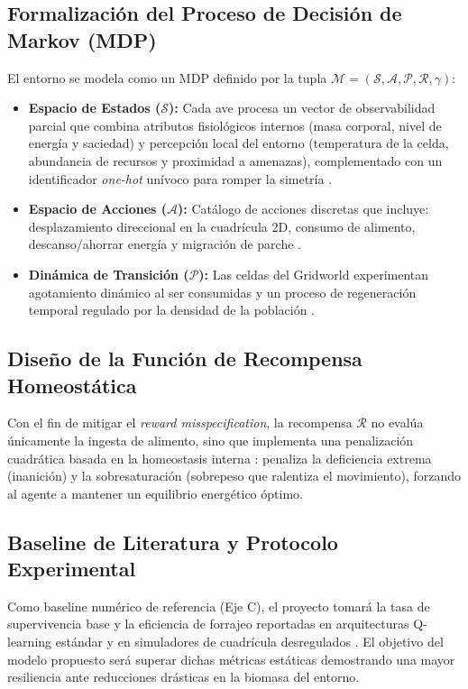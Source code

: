 \documentclass[conference]{IEEEtran}
\begin{document}
\subsection{Formalización del Proceso de Decisión de Markov (MDP)}
El entorno se modela como un MDP definido por la tupla $\mathcal{M} = 
(\mathcal{S}, \mathcal{A}, \mathcal{P}, \mathcal{R}, \gamma)$:
\begin{itemize}
    \item \textbf{Espacio de Estados ($\mathcal{S}$):} Cada ave procesa un vector
     de observabilidad parcial que combina atributos fisiológicos internos 
     (masa corporal, nivel de energía y saciedad) y percepción local del 
     entorno (temperatura de la celda, abundancia de recursos y proximidad a 
     amenazas), complementado con un identificador \textit{one-hot} unívoco 
     para romper la simetría \cite{Paper12}.
    \item \textbf{Espacio de Acciones ($\mathcal{A}$):} Catálogo de acciones 
    discretas que incluye: desplazamiento direccional en la cuadrícula 2D, 
    consumo de alimento, descanso/ahorrar energía y migración de parche 
    \cite{Paper16}.
    \item \textbf{Dinámica de Transición ($\mathcal{P}$):} Las celdas del 
    Gridworld experimentan agotamiento dinámico al ser consumidas y un proceso 
    de regeneración temporal regulado por la densidad de la población 
    \cite{Paper14}.
\end{itemize}

\subsection{Diseño de la Función de Recompensa Homeostática}
Con el fin de mitigar el \textit{reward misspecification}, la recompensa 
$\mathcal{R}$ no evalúa únicamente la ingesta de alimento, sino que implementa 
una penalización cuadrática basada en la homeostasis interna \cite{Paper2, 
Paper14}: penaliza la deficiencia extrema (inanición) y la sobresaturación 
(sobrepeso que ralentiza el movimiento), forzando al agente a mantener un 
equilibrio energético óptimo.

\subsection{Baseline de Literatura y Protocolo Experimental}
Como baseline numérico de referencia (Eje C), el proyecto tomará la tasa de 
supervivencia base y la eficiencia de forrajeo reportadas en arquitecturas 
Q-learning estándar y en simuladores de cuadrícula desregulados \cite{Paper14}. 
El objetivo del modelo propuesto será superar dichas métricas estáticas 
demostrando una mayor resiliencia ante reducciones drásticas en la biomasa del 
entorno.
\end{document}
